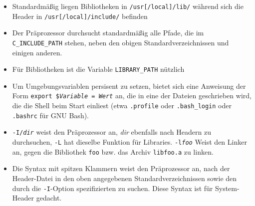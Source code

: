 \documentclass{article}
\begin{document}
   \begin{itemize}
      \item Standardmäßig liegen Bibliotheken in \texttt{/usr[/local]/lib/}
         während sich die Header in \texttt{/usr[/local]/include/} befinden
      \item Der Präprozessor durchsucht standardmäßig alle Pfade, die im
         \texttt{C\_INCLUDE\_PATH} stehen, neben
         den obigen Standardverzeichnissen und einigen anderen.
      \item Für Bibliotheken ist die Variable \texttt{LIBRARY\_PATH} nützlich
      \item Um Umgebungsvariablen persisent zu setzen, bietet sich eine
         Anweisung der Form \texttt{export \$\emph{Variable} = \emph{Wert}} an,
         die in eine der Dateien geschrieben wird, die die Shell beim Start
         einliest (etwa \texttt{.profile} oder \texttt{.bash\_login} oder
         \texttt{.bashrc} für GNU Bash).
      \item \texttt{-I/\emph{dir}} weist den Präprozessor an, \emph{dir}
         ebenfalls nach Headern zu durchsuchen, \texttt{-L} hat dieselbe
         Funktion für Libraries. \texttt{-l\emph{foo}} Weist den Linker an,
         gegen die Bibliothek \texttt{foo} bzw. das Archiv \texttt{libfoo.a} zu
         linken.
      \item Die Syntax mit spitzen Klammern weist den Präprozessor an, nach der
         Header-Datei in den oben angegebenen Standardverzeichnissen sowie den
         durch die \texttt{-I}-Option spezifizierten zu suchen.
         Diese Syntax ist für System-Header gedacht.


\end{itemize}
\end{document}
